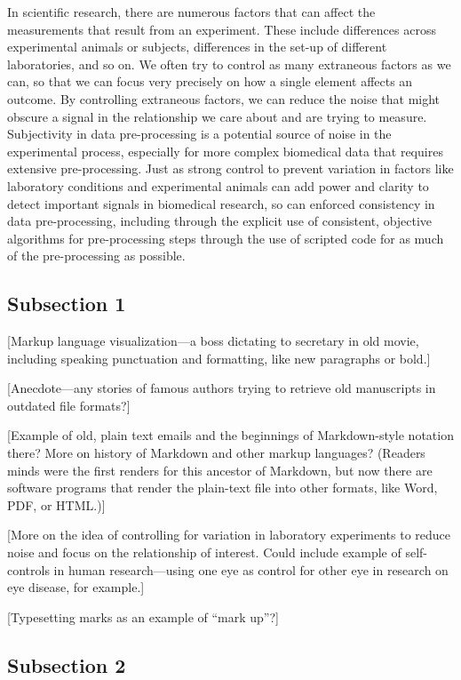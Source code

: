 \documentclass[]{tufte-book}
\begin{document}
In scientific research, there are numerous factors that can affect the
measurements that result from an experiment. These include differences across
experimental animals or subjects, differences in the set-up of different
laboratories, and so on. We often try to control as many extraneous factors as
we can, so that we can focus very precisely on how a single element affects an
outcome. By controlling extraneous factors, we can reduce the noise that might
obscure a signal in the relationship we care about and are trying to measure.
Subjectivity in data pre-processing is a potential source of noise in the
experimental process, especially for more complex biomedical data that requires
extensive pre-processing. Just as strong control to prevent variation in factors
like laboratory conditions and experimental animals can add power and clarity to
detect important signals in biomedical research, so can enforced consistency in
data pre-processing, including through the explicit use of consistent, objective
algorithms for pre-processing steps through the use of scripted code for as much
of the pre-processing as possible.

\hypertarget{subsection-1-9}{%
\subsection{Subsection 1}\label{subsection-1-9}}

{[}Markup language visualization---a boss dictating to secretary in old movie, including
speaking punctuation and formatting, like new paragraphs or bold.{]}

{[}Anecdote---any stories of famous authors trying to retrieve old manuscripts in
outdated file formats?{]}

{[}Example of old, plain text emails and the beginnings of Markdown-style notation
there? More on history of Markdown and other markup languages? (Readers minds were the
first renders for this ancestor of Markdown, but now there are software programs
that render the plain-text file into other formats, like Word, PDF, or HTML.){]}

{[}More on the idea of controlling for variation in laboratory experiments to reduce
noise and focus on the relationship of interest. Could include example of self-controls
in human research---using one eye as control for other eye in research on
eye disease, for example.{]}

{[}Typesetting marks as an example of ``mark up''?{]}

\hypertarget{subsection-2-8}{%
\subsection{Subsection 2}\label{subsection-2-8}}
\end{document}
